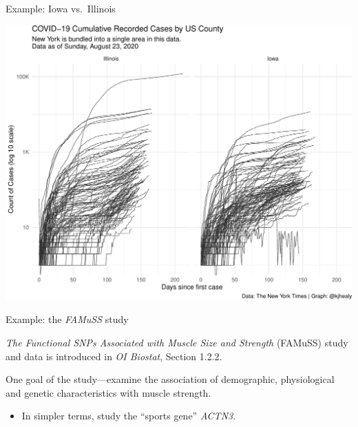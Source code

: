 \documentclass[
  ignorenonframetext,
]{beamer}
\providecommand{\tightlist}{%
  \setlength{\itemsep}{0pt}\setlength{\parskip}{0pt}}
\begin{document}
\begin{frame}[fragile]{Example: Iowa vs.~Illinois}
\begin{center}\includegraphics[width=1\linewidth]{001-exploring-data_files/figure-beamer/unnamed-chunk-2-1} \end{center}

\normalsize

\end{frame}

\begin{frame}{Example: the \emph{FAMuSS} study}
\protect\hypertarget{example-the-famuss-study}{}

\emph{The Functional SNPs Associated with Muscle Size and Strength}
(FAMuSS) study and data is introduced in \emph{OI Biostat}, Section
1.2.2.

One goal of the study---examine the association of demographic,
physiological and genetic characteristics with muscle strength.

\begin{itemize}
\tightlist
\item
  In simpler terms, study the ``sports gene'' \emph{ACTN3}.
\end{itemize}

\end{frame}
\end{document}
